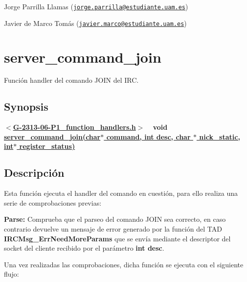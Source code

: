 \begin{DoxyItemize}
\item Jorge Parrilla Llamas (\href{mailto:jorge.parrilla@estudiante.uam.es}{\tt jorge.\+parrilla@estudiante.\+uam.\+es}) 
\item Javier de Marco Tomás (\href{mailto:javier.marco@estudiante.uam.es}{\tt javier.\+marco@estudiante.\+uam.\+es}) 
\end{DoxyItemize}\hypertarget{server_command_join}{}\section{server\+\_\+command\+\_\+join}\label{server_command_join}
Función handler del comando J\+O\+I\+N del I\+R\+C.\hypertarget{server_command_join_synopsis_join}{}\subsection{Synopsis}\label{server_command_join_synopsis_join}
{ {\bfseries $<$\hyperlink{G-2313-06-P1__function__handlers_8h}{G-\/2313-\/06-\/\+P1\+\_\+function\+\_\+handlers.\+h}$>$} ~\newline
 {\bfseries void \hyperlink{G-2313-06-P1__function__handlers_8c_a375c143c5469d1bb4fa7793b310ad68e}{server\+\_\+command\+\_\+join(char$\ast$ command, int desc, char $\ast$ nick\+\_\+static, int$\ast$ register\+\_\+status)}} } \hypertarget{server_command_join_descripcion_join}{}\subsection{Descripción}\label{server_command_join_descripcion_join}
Esta función ejecuta el handler del comando en cuestión, para ello realiza una serie de comprobaciones previas\+:


\begin{DoxyItemize}
\item {\bfseries Parse\+:} Comprueba que el parseo del comando J\+O\+I\+N sea correcto, en caso contrario devuelve un mensaje de error generado por la función del T\+A\+D {\bfseries I\+R\+C\+Msg\+\_\+\+Err\+Need\+More\+Params} que se envía mediante el descriptor del socket del cliente recibido por el parámetro {\bfseries int desc}. 
\end{DoxyItemize}

Una vez realizadas las comprobaciones, dicha función se ejecuta con el siguiente flujo\+:


